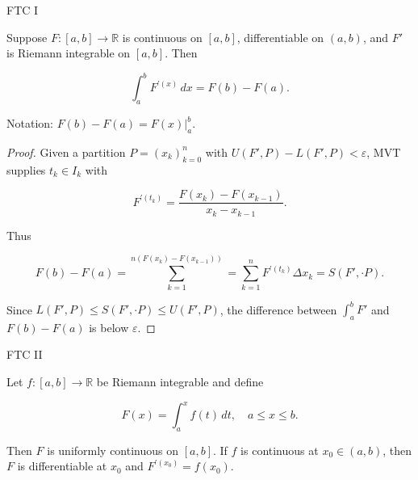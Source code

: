 \begin{theorem}{FTC I}

Suppose \(F:\left\lbrack {a,b} \right\rbrack\rightarrow\mathbb{R}\) is continuous on \(\left\lbrack {a,b} \right\rbrack\), differentiable on \(\left( {a,b} \right)\), and \(F'\) is Riemann integrable on \(\left\lbrack {a,b} \right\rbrack\). Then

\[\int_{a}^{b}F^{'{(x)}}\, dx = F(b) - F(a).\]

Notation: \(F(b) - F(a) = F(x)|_{a}^{b}\).

\end{theorem}

\begin{proof}

Given a partition \(P = \left( x_{k} \right)_{k = 0}^{n}\) with \(U\left( {F',P} \right) - L\left( {F',P} \right) < \varepsilon\), MVT supplies \(t_{k} \in I_{k}\) with

\[F^{'{(t_{k})}} = \frac{F\left( x_{k} \right) - F\left( x_{k - 1} \right)}{x_{k} - x_{k - 1}}.\]

Thus

\[F(b) - F(a) = \sum\limits_{k = 1}^{n{({F{(x_{k})} - F{(x_{k - 1})}})}} = \sum\limits_{k = 1}^{n}F^{'{(t_{k})}}\Delta x_{k} = S\left( {F', \cdot P} \right).\]

Since \(L\left( {F',P} \right) \leq S\left( {F', \cdot P} \right) \leq U\left( {F',P} \right)\), the difference between \(\int_{a}^{b}F'\) and \(F(b) - F(a)\) is below \(\varepsilon\).

\end{proof}

\begin{theorem}{FTC II}

Let \(f:\left\lbrack {a,b} \right\rbrack\rightarrow\mathbb{R}\) be Riemann integrable and define

\[F(x) = \int_{a}^{x}f(t)\, dt,\quad a \leq x \leq b.\]

Then \(F\) is uniformly continuous on \(\left\lbrack {a,b} \right\rbrack\). If \(f\) is continuous at \(x_{0} \in \left( {a,b} \right)\), then \(F\) is differentiable at \(x_{0}\) and \(F^{'{(x_{0})}} = f\left( x_{0} \right)\).

\end{theorem}

